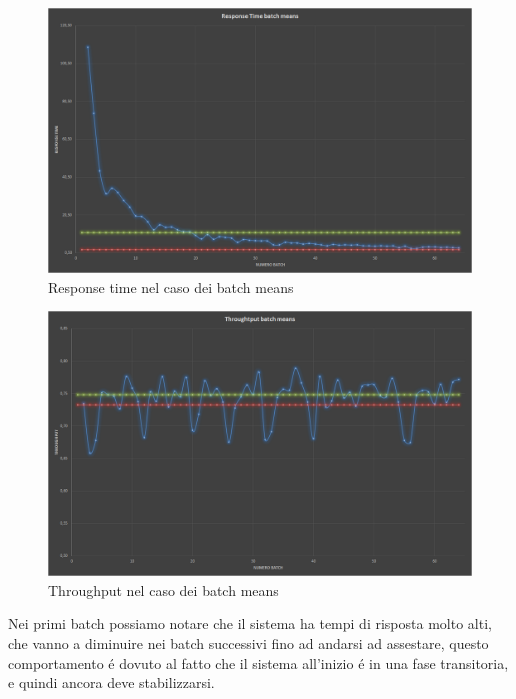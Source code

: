 \begin{figure}[H]
 \centering
 \includegraphics[scale=0.4]{img/resTimeBM.png}
 \caption[Response time nel caso dei batch means]{Response time nel caso dei batch means}
 \label{fig:Response time nel caso dei batch means}
\end{figure}

\begin{figure}[H]
 \centering
 \includegraphics[scale=0.4]{img/throughputBM.png}
 \caption[Throughput nel caso dei batch means]{Throughput nel caso dei batch means}
 \label{fig:Throughput nel caso dei batch means}
\end{figure}

Nei primi batch possiamo notare che il sistema ha tempi di risposta molto alti, che vanno a
diminuire nei batch successivi fino ad andarsi ad assestare, questo comportamento \'e dovuto al
fatto che il sistema all'inizio \'e in una fase transitoria, e quindi ancora deve stabilizzarsi.

